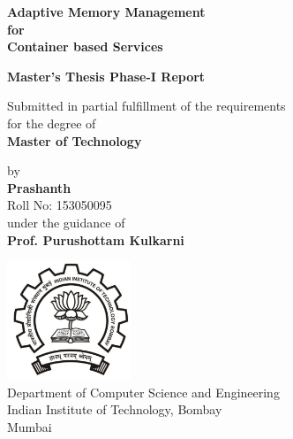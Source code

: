 \documentclass[11pt,a4paper,openright]{report}
\newcommand{\putiitblogo}{\includegraphics[width=10em]{iitb-black}}
\begin{document}
  \begin{titlepage}    
    \begin{center}
   
      \Large \textbf{Adaptive Memory Management \\for \\Container based Services}  \\
      \vspace{5em}
      
      \large \textbf{Master's Thesis Phase-I Report} \\
      \vspace{5em}
      
      \normalsize Submitted in partial fulfillment of the requirements \\ for the degree of \\
      \vspace{1em}      
      \large \textbf{Master of Technology} \\
      \vspace{5em}
      
      \normalsize by \\
      \vspace{1em}      
      \large \textbf{Prashanth} \\ 
      \vspace{0.5em}
      \normalsize Roll No: 153050095 \\
      
      \vspace{5em}
      \normalsize under the guidance of \\
      \vspace{0.5em}      
      \large \textbf{Prof. Purushottam Kulkarni} \\
      \vspace{5em}
      
      \putiitblogo \\
      \Large 
      Department of Computer Science and Engineering \\
      Indian Institute of Technology, Bombay \\
      Mumbai
      
    \end{center}
  \end{titlepage} 
  
  
  \tableofcontents
  \listoftables
  \listoffigures
  \cleardoublepage
  \setcounter{page}{1}
  \setlength{\parskip}{1em}
  
    
    
  
  
  
  
  
  
  
    
  
\end{document}
